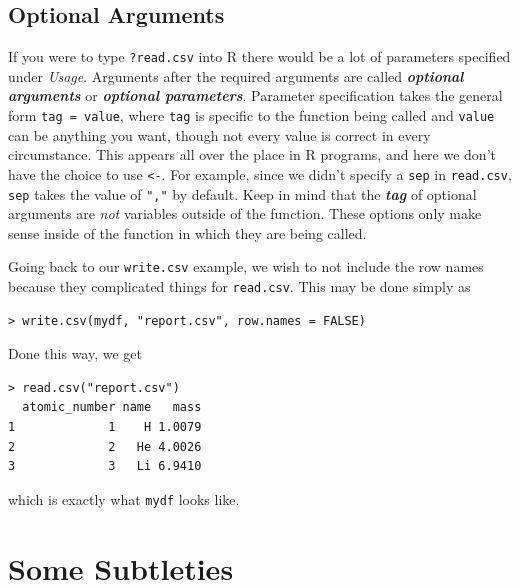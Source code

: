 \documentclass[12pt]{article}
\theoremstyle{remark}
\newcommand{\vocab}[1]{\textbf{\emph{#1}}}
\begin{document}
\subsection{Optional Arguments}
If you were to type \verb|?read.csv| into R there would be a lot of parameters specified under \emph{Usage}. Arguments after the required arguments are called \vocab{optional arguments} or \vocab{optional parameters}. Parameter specification takes the general form \verb|tag = value|, where \verb|tag| is specific to the function being called and \verb|value| can be anything you want, though not every value is correct in every circumstance. This appears all over the place in R programs, and here we don't have the choice to use \verb|<-|. For example, since we didn't specify a \verb|sep| in \verb|read.csv|, \verb|sep| takes the value of \verb|","| by default. Keep in mind that the \vocab{tag} of optional arguments are \emph{not} variables outside of the function. These options only make sense inside of the function in which they are being called.

Going back to our \verb|write.csv| example, we wish to not include the row names because they complicated things for \verb|read.csv|. This may be done simply as
\begin{verbatim}
> write.csv(mydf, "report.csv", row.names = FALSE)
\end{verbatim}

Done this way, we get
\begin{verbatim}
> read.csv("report.csv")
  atomic_number name   mass
1             1    H 1.0079
2             2   He 4.0026
3             3   Li 6.9410
\end{verbatim}
which is exactly what \verb|mydf| looks like.


\section{Some Subtleties}
\end{document}
